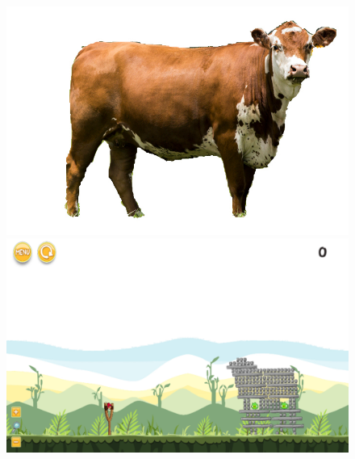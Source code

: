 \documentclass{dalthesis}
\begin{document}
\begin{figure}
  \includegraphics[width=\textwidth,height=\textheight,keepaspectratio]{levels/pictures/animals/cow.jpg}
  \includegraphics[width=\textwidth,height=\textheight,keepaspectratio]{levels/screenshots/animals/cow.png}
\end{figure}
\end{document}
